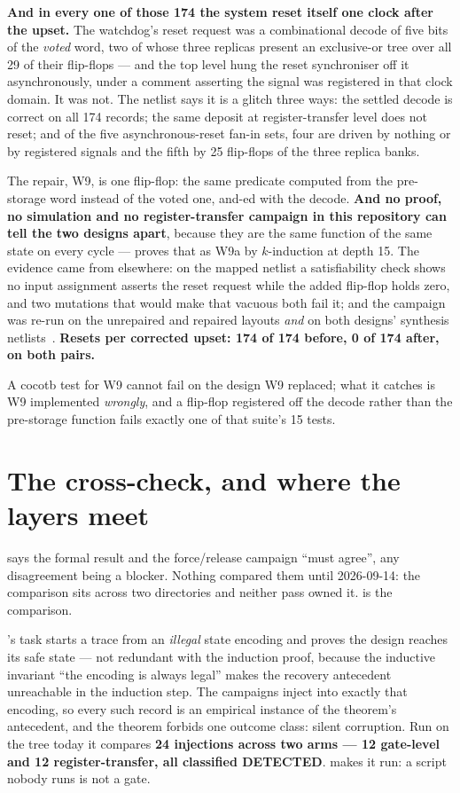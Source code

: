\textbf{And in every one of those 174 the system reset itself one clock after the upset.} The watchdog's reset request was a combinational decode of five bits of the \emph{voted} word, two of whose three replicas present an exclusive-or tree over all 29 of their flip-flops --- and the top level hung the reset synchroniser off it asynchronously, under a comment asserting the signal was registered in that clock domain. It was not. The netlist says it is a glitch three ways: the
settled decode is correct on all 174 records; the same deposit at
register-transfer level does not reset; and of the five
asynchronous-reset fan-in sets, four are driven by nothing or by
registered signals and the fifth by 25 flip-flops of the three replica
banks.

The repair, W9, is one flip-flop: the same predicate computed from the
pre-storage word instead of the voted one, and-ed with the decode.
\textbf{And no proof, no simulation and no register-transfer campaign in
this repository can tell the two designs apart}, because they are the
same function of the same state on every cycle --- 
proves that as W9a by $k$-induction at depth 15. The evidence came from elsewhere: on the mapped netlist a satisfiability check shows no input assignment asserts the reset request while the added flip-flop holds zero, and two mutations that would make that vacuous both fail it; and the campaign was re-run on the unrepaired and repaired layouts \emph{and} on both designs' synthesis netlists~\cite{companion_tmr}. \textbf{Resets per
corrected upset: 174 of 174 before, 0 of 174 after, on both pairs.}

A cocotb test for W9 cannot fail on the design W9 replaced; what it catches is W9 implemented \emph{wrongly}, and a flip-flop registered off the decode rather than the pre-storage function fails exactly one of that suite's 15 tests.

\section{The cross-check, and where the layers meet}
\label{sec:verif-cross}

 says the formal result and the force/release campaign ``must agree'', any disagreement being a blocker. Nothing compared them until 2026-09-14: the comparison sits across two directories and neither pass owned it.  is the comparison.

's  task starts a trace from an \emph{illegal} state encoding and proves the design reaches its safe
state --- not redundant with the induction proof, because the inductive
invariant ``the encoding is always legal'' makes the recovery antecedent
unreachable in the induction step. The campaigns inject into exactly
that encoding, so every such record is an empirical instance of the
theorem's antecedent, and the theorem forbids one outcome class: silent
corruption. Run on the tree today it compares \textbf{24 injections
across two arms --- 12 gate-level and 12 register-transfer, all
classified DETECTED}.  makes it run: a script nobody runs is not a gate.

